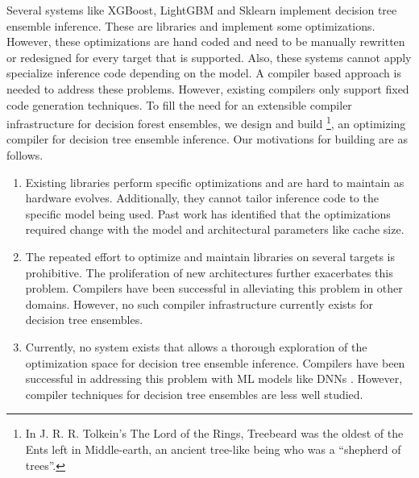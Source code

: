 Several systems like XGBoost\cite{XGBoost}, LightGBM\cite{LightGBM} and Sklearn\cite{Sklearn} implement
decision tree ensemble inference. These are libraries and implement some optimizations. However, these optimizations are hand
coded and need to be manually rewritten or redesigned for every target that is supported. Also, these 
systems cannot apply specialize inference code depending on the model. A compiler based approach is 
needed to address these problems. However, existing compilers only support fixed code generation techniques\cite{Treelite, Hummingbird}.
To fill the need for an extensible compiler infrastructure for decision forest ensembles, we design and 
build \Treebeard{}\footnote{In J. R. R. Tolkein's The Lord of the Rings, Treebeard was the oldest of the Ents left in Middle-earth, an 
ancient tree-like being who was a ``shepherd of trees''.}, an optimizing compiler for decision tree ensemble inference.
Our motivations for building \Treebeard{} are as follows. 
\begin{enumerate}
  \item Existing libraries \cite{XGBoost, Treelite, LightGBM, VPred} perform specific optimizations and are hard to maintain as hardware evolves. 
  Additionally, they cannot tailor inference code to the specific model being used. Past work has identified that the optimizations required change with the model
  and architectural parameters like cache size\cite{CacheConscious1, CacheConscious2, VPred}. 
  \item The repeated effort to optimize and maintain libraries on several targets is prohibitive. The proliferation of new architectures
  further exacerbates this problem. Compilers have been successful in alleviating this problem in other domains\cite{Halide, TVM}.
  However, no such compiler infrastructure currently exists for decision tree ensembles.
  \item Currently, no system exists that allows a thorough exploration of the optimization space for decision tree ensemble inference. 
  Compilers have been successful in addressing this problem with ML models like DNNs \cite{TVM, Tiramisu, XLA}. However, compiler techniques for
  decision tree ensembles are less well studied.
\end{enumerate}

